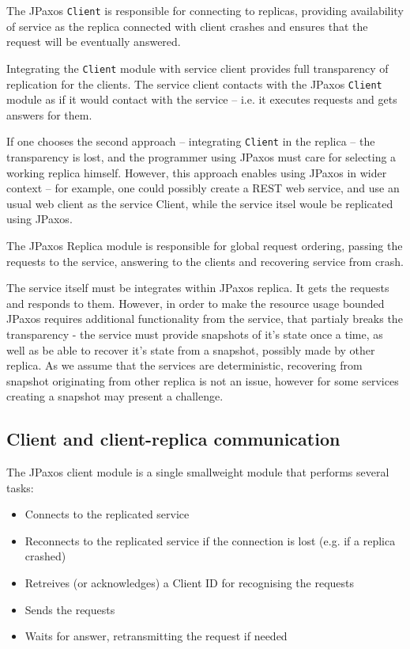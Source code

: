 The JPaxos \texttt{Client} is responsible for connecting to replicas, providing availability of service as the replica connected with client crashes and ensures that the request will be eventually answered.

Integrating the \texttt{Client} module with service client provides full transparency of replication for the clients.
The service client contacts with the JPaxos \texttt{Client} module as if it would contact with the service -- i.e. it executes requests and gets answers for them.

If one chooses the second approach -- integrating \texttt{Client} in the replica -- the transparency is lost, and the programmer using JPaxos must care for selecting a working replica himself. However, this approach enables using JPaxos in wider context -- for example, one could possibly create a REST web service, and use an usual web client as the service Client, while the service itsel woule be replicated using JPaxos.

The JPaxos Replica module is responsible for global request ordering, passing the requests to the service, answering to the clients and recovering service from crash.

The service itself must be integrates within JPaxos replica. It gets the requests and responds to them. However, in order to make the resource usage bounded JPaxos requires additional functionality from the service, that partialy breaks the transparency - the service must provide snapshots of it's state
once a time, %
as well as be able to recover it's state from a snapshot, possibly made by other replica.
As we assume that the services are deterministic, recovering from snapshot originating from other replica is not an issue, however for some services creating a snapshot may present a challenge.

\subsection{Client and client-replica communication}

The JPaxos client module is a single smallweight module that performs several tasks:
\begin{itemize} 
 \item Connects to the replicated service
 \item Reconnects to the replicated service if the connection is lost (e.g. if a replica crashed)
 \item Retreives (or acknowledges) a Client ID for recognising the requests
 \item Sends the requests
 \item Waits for answer, retransmitting the request if needed
\end{itemize}


